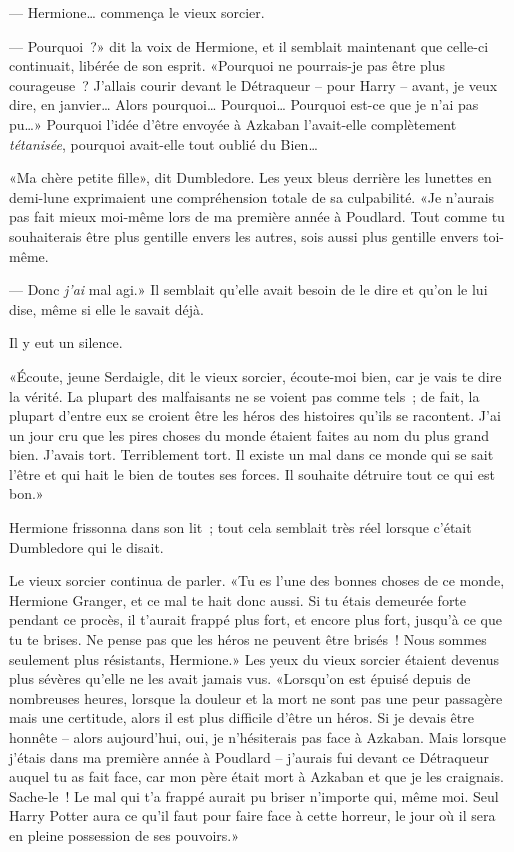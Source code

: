 --- Hermione… commença le vieux sorcier.

--- Pourquoi~?» dit la voix de Hermione, et il semblait maintenant que celle-ci continuait, libérée de son esprit. «Pourquoi ne pourrais-je pas être plus courageuse~? J'allais courir devant le Détraqueur -- pour Harry -- avant, je veux dire, en janvier… Alors pourquoi… Pourquoi… Pourquoi est-ce que je n'ai pas pu…» Pourquoi l'idée d'être envoyée à Azkaban l'avait-elle complètement \emph{tétanisée}, pourquoi avait-elle tout oublié du Bien…

«Ma chère petite fille», dit Dumbledore. Les yeux bleus derrière les lunettes en demi-lune exprimaient une compréhension totale de sa culpabilité. «Je n'aurais pas fait mieux moi-même lors de ma première année à Poudlard. Tout comme tu souhaiterais être plus gentille envers les autres, sois aussi plus gentille envers toi-même.

--- Donc \emph{j'ai} mal agi.» Il semblait qu'elle avait besoin de le dire et qu'on le lui dise, même si elle le savait déjà.

Il y eut un silence.

«Écoute, jeune Serdaigle, dit le vieux sorcier, écoute-moi bien, car je vais te dire la vérité. La plupart des malfaisants ne se voient pas comme tels~; de fait, la plupart d'entre eux se croient être les héros des histoires qu'ils se racontent. J'ai un jour cru que les pires choses du monde étaient faites au nom du plus grand bien. J'avais tort. Terriblement tort. Il existe un mal dans ce monde qui se sait l'être et qui hait le bien de toutes ses forces. Il souhaite détruire tout ce qui est bon.»

Hermione frissonna dans son lit~; tout cela semblait très réel lorsque c'était Dumbledore qui le disait.

Le vieux sorcier continua de parler. «Tu es l'une des bonnes choses de ce monde, Hermione Granger, et ce mal te hait donc aussi. Si tu étais demeurée forte pendant ce procès, il t'aurait frappé plus fort, et encore plus fort, jusqu'à ce que tu te brises. Ne pense pas que les héros ne peuvent être brisés~! Nous sommes seulement plus résistants, Hermione.» Les yeux du vieux sorcier étaient devenus plus sévères qu'elle ne les avait jamais vus. «Lorsqu'on est épuisé depuis de nombreuses heures, lorsque la douleur et la mort ne sont pas une peur passagère mais une certitude, alors il est plus difficile d'être un héros. Si je devais être honnête -- alors aujourd'hui, oui, je n'hésiterais pas face à Azkaban. Mais lorsque j'étais dans ma première année à Poudlard -- j'aurais fui devant ce Détraqueur auquel tu as fait face, car mon père était mort à Azkaban et que je les craignais. Sache-le~! Le mal qui t'a frappé aurait pu briser n'importe qui, même moi. Seul Harry Potter aura ce qu'il faut pour faire face à cette horreur, le jour où il sera en pleine possession de ses pouvoirs.»

